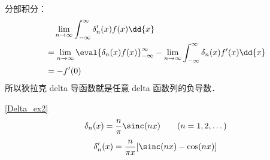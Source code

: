 
\begin{issues}
\issueDraft
\end{issues}


分部积分：
\begin{equation}
\begin{aligned}
&\quad \lim_{n\to\infty}\int_{-\infty}^\infty \delta'_n(x) f(x) \dd{x}\\
&= \lim_{n\to\infty}\eval{\delta_n(x) f(x)}_{-\infty}^\infty - \lim_{n\to\infty}\int_{-\infty}^\infty \delta_n(x) f'(x) \dd{x}\\
&= - f'(0)
\end{aligned}
\end{equation}
所以狄拉克 delta 导函数就是任意 delta 函数列的负导数．

\begin{example}{}
\autoref{Delta_ex2}~
\begin{equation}
\delta_n(x) = \frac{n}{\pi}\sinc(n x) \qquad (n = 1, 2, \dots)
\end{equation}
\begin{equation}
\delta'_n(x) = \frac{n}{\pi x} [\sinc(nx) - \cos(nx)]
\end{equation}
\end{example}
